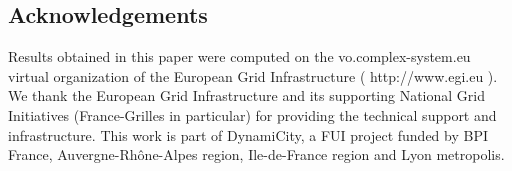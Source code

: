 \documentclass{bmcart}
\begin{document}
\begin{backmatter}


\section*{Acknowledgements}
 
 
 Results obtained in this paper were computed on the vo.complex-system.eu virtual organization of the European Grid Infrastructure ( http://www.egi.eu ). We thank the European Grid Infrastructure and its supporting National Grid Initiatives (France-Grilles in particular) for providing the technical support and infrastructure. This work is part of DynamiCity, a FUI project funded by BPI France, Auvergne-Rh{\^o}ne-Alpes region, Ile-de-France region and Lyon metropolis.
  
  




\end{backmatter}
\end{document}
